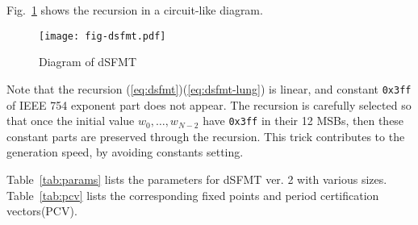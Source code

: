 \documentclass{svmult}
\begin{document}
Fig.~\ref{fig:dsfmt} shows the recursion in a circuit-like diagram.

\begin{figure}
  \centering
  \texttt{[image: fig-dsfmt.pdf]}
  \caption{Diagram of dSFMT}
  \label{fig:dsfmt}
\end{figure}

Note that the recursion (\ref{eq:dsfmt})(\ref{eq:dsfmt-lung})
is linear, and constant \texttt{0x3ff} of IEEE 754 exponent part
does not appear.
The recursion is carefully selected so that once
the initial value $w_0,\ldots , w_{N-2}$ have \texttt{0x3ff} in their 12 MSBs,
then these constant parts are preserved through the recursion. 
This trick contributes to the generation speed, by avoiding
constants setting.

Table~\ref{tab:params} lists the parameters 
for dSFMT ver. 2 with various sizes.
Table~\ref{tab:pcv} lists the corresponding fixed points and period
certification vectors(PCV).

\end{document}
